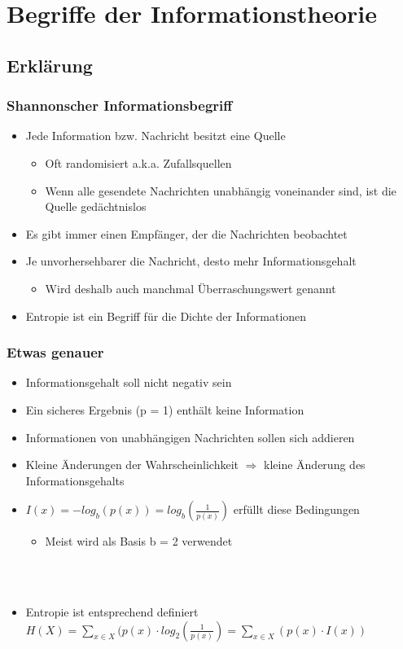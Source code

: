 




\section{Begriffe der Informationstheorie}
\subsection{Erklärung}
\begin{frame}
	\frametitle{Shannonscher Informationsbegriff}
	\begin{itemize}
		\item Jede Information bzw. Nachricht besitzt eine Quelle
		\begin{itemize}
			\item Oft randomisiert a.k.a. Zufallsquellen
			\item Wenn alle gesendete Nachrichten unabhängig voneinander sind, ist die Quelle gedächtnislos
		\end{itemize}
		\item Es gibt immer einen Empfänger, der die Nachrichten beobachtet
		\item Je unvorhersehbarer die Nachricht, desto mehr Informationsgehalt
		\begin{itemize}
				\item Wird deshalb auch manchmal Überraschungswert genannt
		\end{itemize}
		\item Entropie ist ein Begriff für die Dichte der Informationen
	\end{itemize}
\end{frame}

\begin{frame}
	\frametitle{Etwas genauer}
	\begin{itemize}
		\item Informationsgehalt soll nicht negativ sein
		\item Ein sicheres Ergebnis (p = 1) enthält keine Information
		\item Informationen von unabhängigen Nachrichten sollen sich addieren
		\item Kleine Änderungen der Wahrscheinlichkeit $\Rightarrow$ kleine Änderung des Informationsgehalts
		\item $I(x) = -log_b(p(x)) = log_b(\frac{1}{p(x)})$ erfüllt diese Bedingungen
		\begin{itemize}
			\item Meist wird als Basis b = 2 verwendet
		\end{itemize}~\\~\\
		\item Entropie ist entsprechend definiert~\\ $H(X) = \sum\limits_{x \in X} (p(x) \cdot log_2(\frac{1}{p(x)}) = \sum\limits_{x \in X} (p(x) \cdot I(x))$
	\end{itemize}
\end{frame}

